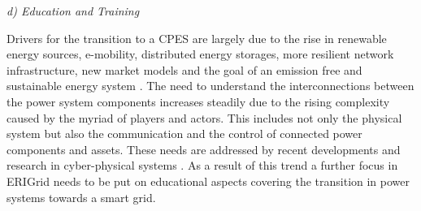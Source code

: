 \documentclass[runningheads,a4paper]{llncs}
\begin{document}


\noindent\textit{d) Education and Training\\[-0.5em]}

\noindent Drivers for the transition to a CPES are largely due to the rise in renewable energy sources, e-mobility, distributed energy storages, more resilient network infrastructure, new market models and the goal of an emission free and sustainable energy system \cite{EC:2007,EC:2011,IEA:2011}. The need to understand the interconnections between the power system components increases steadily due to the rising complexity caused by the myriad of players and actors. This includes not only the physical system but also the communication and the control of connected power components and assets. These needs are addressed by recent developments and research in cyber-physical systems \cite{Strasser:2015}. As a result of this trend a further focus in ERIGrid needs to be put on educational aspects covering the transition in power systems towards a smart grid. 
\end{document}
